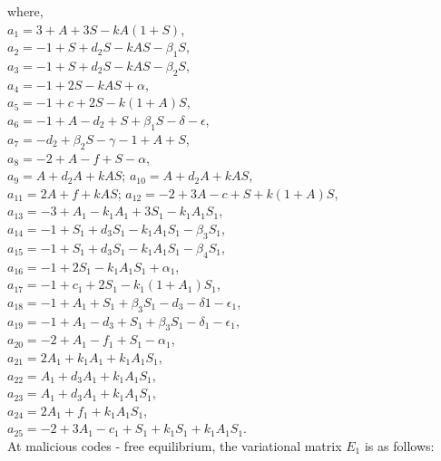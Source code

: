 \noindent where,\\
\noindent $a_1=3+A+3S- k A (1+S)$,\\
$a_2=-1+S+d_{2} S-  k A S- \beta_{1} S$,\\
$a_3=-1+S+d_{2} S-  k A S- \beta_{2} S$,\\
$a_4=-1+2S- k A S+\alpha$,\\
$a_5=-1+c+2S-k (1+A) S$,\\
$a_6=-1+A-d_{2}+S+ \beta_{1} S-\delta -\epsilon$,\\
$a_7=-d_{2}+\beta_{2} S-\gamma-1+A+S$,\\
$a_8=-2+A-f+S-\alpha$,\\
$a_9=A+d_{2} A+k A S$;  $a_{10}=A+d_{2} A+k A S$,\\
$a_{11}=2A+f+k A S$;  $a_{12}=-2+3A-c+S+k (1+A) S$,\\
$a_{13}=-3+A_{1}- k_{1} A_{1}+3 S_{1}- k_{1} A_{1} S_{1}$,\\
$a_{14}=-1+S_{1}+d_{3} S_{1}- k_{1} A_{1} S_{1}-\beta_{3} S_{1}$,\\
$a_{15}=-1+S_{1}+d_{3} S_{1}-k_{1} A_{1}  S_{1}-\beta_{4} S_{1}$,\\
$a_{16}=-1+2 S_{1}-k_{1} A_{1} S_{1}+\alpha_{1}$,\\
$a_{17}=-1+c_{1}+2 S_{1}-k_{1}  (1+A_{1}) S_{1}$,\\
$a_{18}=-1+A_{1}+S_{1}+\beta_{3} S_{1}-d_{3} - \delta{1} - \epsilon_{1}$,\\
$a_{19}=-1+A_{1}-d_{3} +S_{1}+ \beta_{3} S_{1} - \delta_{1}-\epsilon_{1}$,\\
$a_{20}=-2+A_{1}-f_{1}+S_{1}-\alpha_{1}$,\\
$a_{21}=2 A_{1}+ k_{1} A_{1}+k_{1} A_{1} S_{1}$,\\
$a_{22}=A_{1}+d_{3} A_{1}+ k_{1} A_{1} S_{1}$,\\
$a_{23}=A_{1}+d_{3} A_{1}+k_{1} A_{1} S_{1}$,\\
$a_{24}=2 A_{1}+f_{1}+ k_{1} A_{1} S_{1}$,\\
$a_{25}=-2+3 A_{1}-c_{1}+S_{1}+k_{1} S_{1}+  k_{1} A_{1} S_{1}.$\\

\noindent At malicious codes - free equilibrium, the variational matrix $E_1$ is as follows:\\

